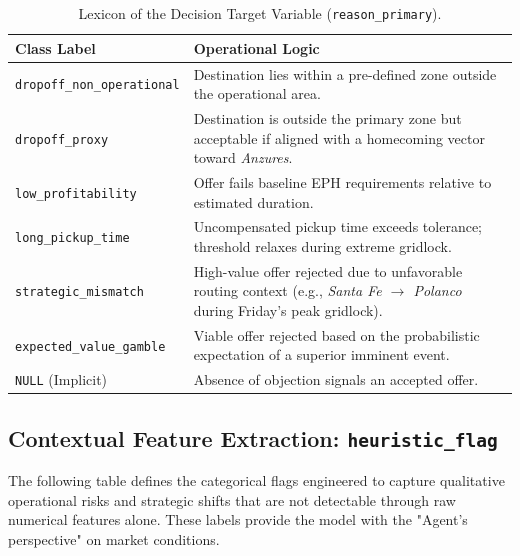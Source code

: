 \begin{table}[H]
    \centering
    \small
    \begin{tabularx}{\textwidth}{l X} 
        \toprule
        \textbf{Class Label} & \textbf{Operational Logic} \\
        \midrule
        \texttt{dropoff\_non\_operational} & Destination lies within a pre-defined zone outside the operational area. \\
        \addlinespace
        \texttt{dropoff\_proxy} & Destination is outside the primary zone but acceptable if aligned with a homecoming vector toward \textit{Anzures}. \\
        \addlinespace
        \texttt{low\_profitability} & Offer fails baseline EPH requirements relative to estimated duration. \\
        \addlinespace
        \texttt{long\_pickup\_time} & Uncompensated pickup time exceeds tolerance; threshold relaxes during extreme gridlock. \\
        \addlinespace
        \texttt{strategic\_mismatch} & High-value offer rejected due to unfavorable routing context (e.g., \textit{Santa Fe $\to$ Polanco} during Friday's peak gridlock). \\
        \addlinespace
        \texttt{expected\_value\_gamble} & Viable offer rejected based on the probabilistic expectation of a superior imminent event. \\
        \addlinespace
        \texttt{NULL} (Implicit) & Absence of objection signals an accepted offer. \\
        \bottomrule
    \end{tabularx}
    \caption{Lexicon of the Decision Target Variable (\texttt{reason\_primary}).}
    \label{tab:target_lexicon}
\end{table}








\subsection{Contextual Feature Extraction: \texttt{heuristic\_flag}}
The following table defines the categorical flags engineered to capture qualitative operational risks and strategic shifts that are not detectable through raw numerical features alone. These labels provide the model with the "Agent's perspective" on market conditions.

